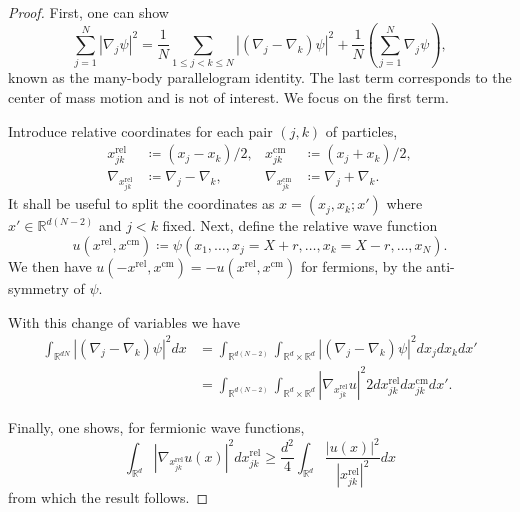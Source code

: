 \begin{proof}
  First, one can show
  \begin{equation}
    \sum_{j=1}^N |\nabla_j \psi|^2 = \frac{1}{N} \sum_{1 \le j < k \le N} \left| (\nabla_j - \nabla_k) \psi \right|^2 + \frac{1}{N} \left( \sum_{j=1}^N \nabla_j \psi \right),
  \end{equation}
  known as the many-body parallelogram identity. The last term corresponds to the center of mass motion and is not of interest. We focus on the first term.

  Introduce relative coordinates for each pair $(j,k)$ of particles,
  \begin{equation}
    \begin{aligned}
      x_{jk}^\text{rel} &\coloneqq (x_j - x_k)/2, & x_{jk}^\text{cm} &\coloneqq (x_j + x_k)/2, \\
      \nabla_{x_{jk}^\text{rel}} &\coloneqq \nabla_j - \nabla_k, & \nabla_{x_{jk}^\text{cm}} &\coloneqq \nabla_j + \nabla_k.
    \end{aligned}
  \end{equation}
  It shall be useful to split the coordinates as $x = (x_j, x_k; x')$ where $x' \in \mathbb{R}^{d(N-2)}$ and $j < k$ fixed. Next, define the relative wave function
  \begin{equation}
    u(x^\text{rel}, x^\text{cm}) \coloneqq \psi(x_1, \ldots, x_j = X+r, \ldots, x_k = X-r, \ldots, x_N).
  \end{equation}
  We then have $u(-x^\text{rel}, x^\text{cm}) = -u(x^\text{rel}, x^\text{cm})$ for fermions, by the anti-symmetry of $\psi$.

  With this change of variables we have
  \begin{equation}
    \begin{aligned}
      \int_{\mathbb{R}^{dN}} \left|(\nabla_j-\nabla_k)\psi\right|^2 dx
      &= \int_{\mathbb{R}^{d(N-2)}} \int_{\mathbb{R}^d \times \mathbb{R}^d} \left|(\nabla_j-\nabla_k)\psi\right|^2 dx_jdx_kdx' \\
      &= \int_{\mathbb{R}^{d(N-2)}} \int_{\mathbb{R}^d \times \mathbb{R}^d} \left|\nabla_{x_{jk}^\text{rel}}u\right|^2  2 dx_{jk}^\text{rel}dx_{jk}^\text{cm} dx'.
    \end{aligned}
  \end{equation}

  Finally, one shows, for fermionic wave functions,
  \begin{equation}
    \int_{\mathbb{R}^d} \left|\nabla_{x_{jk}^\text{rel}} u(x) \right|^2 dx_{jk}^\text{rel} \ge \frac{d^2}{4} \int_{\mathbb{R}^d} \frac{|u(x)|^2}{|x_{jk}^\text{rel}|^2} dx
  \end{equation}
  from which the result follows.
\end{proof}

